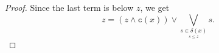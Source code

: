 \documentclass[10pt,a4paper]{amsart}
\begin{document}
\begin{proof}
{Since the last term is below $z$, 
we get 
\[z = (z \wedge \texttt{c}(x)) \vee \bigvee_{\underset{s \le z}{s \in \delta(x)}} s.\]
}
\end{proof}
\end{document}
